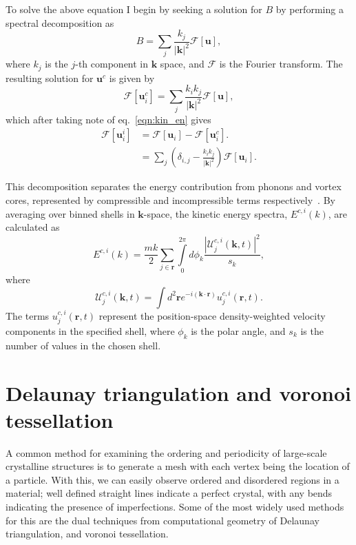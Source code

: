 To solve the above equation I begin by seeking a solution for $B$ by performing a spectral decomposition as
\begin{equation}
    B = \displaystyle\sum\limits_{j} \frac{k_j}{|\mathbf{k}|^2}\mathscr{F}[\mathbf{u}],
\end{equation}
where $k_j$ is the $j$-th component in $\mathbf{k}$ space, and $\mathscr{F}$ is the Fourier transform. The resulting solution for $\mathbf{u}^c$ is given by
\begin{equation}
    \mathscr{F}[\mathbf{u}_i^c] = \displaystyle\sum\limits_{j} \frac{k_i k_j}{|\mathbf{k}|^2} \mathscr{F}[\mathbf{u}],
\end{equation}
which after taking note of eq.~\ref{eqn:kin_en} gives
\begin{align}
    \mathscr{F}[\mathbf{u}_i^i] &= \mathscr{F}[\mathbf{u}_i] - \mathscr{F}[\mathbf{u}_i^c]. \\
    &= \displaystyle\sum\limits_{j}\left(\delta_{i,j} - \frac{k_ik_j}{|\mathbf{k}|^2}\right)\mathscr{F}[\mathbf{u}_i]. \nonumber
\end{align}

This decomposition separates the energy contribution from phonons and vortex cores, represented by compressible and incompressible terms respectively~\cite{CT:Horng_pra_2009}. By averaging over binned shells in $\mathbf{k}$-space, the kinetic energy spectra, $E^{c,i}(k)$, are calculated as~\cite{CT:Bradley_prx_2012}
\begin{equation}
	E^{c,i}(k) = \frac{mk}{2}\sum\limits_{j\in\mathbf{r}} \int\limits_{0}^{2\pi}d\phi_k \frac{ |\mathcal{U}_j^{c,i}(\mathbf{k},t) |^2}{s_k},
\end{equation}
where
\begin{equation}
	\mathcal{U}_j^{c,i}(\mathbf{k},t) = \int d^2 \mathbf{r} e^{-i(\mathbf{k}\cdot\mathbf{r})} u_j^{c,i}(\mathbf{r},t).
\end{equation}
The terms $u_j^{c,i}(\mathbf{r},t)$ represent the position-space density-weighted velocity components in the specified shell, where $\phi_k$ is the polar angle, and $s_k$ is the number of values in the chosen shell.

\section{Delaunay triangulation and voronoi tessellation}
A common method for examining the ordering and periodicity of large-scale crystalline structures is to generate a mesh with each vertex being the location of a particle. With this, we can easily observe ordered and disordered regions in a material; well defined straight lines indicate a perfect crystal, with any bends indicating the presence of imperfections. Some of the most widely used methods for this are the dual techniques from computational geometry of Delaunay triangulation, and voronoi tessellation.

